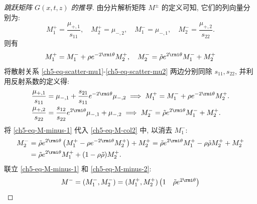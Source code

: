 \begin{proof}[跳跃矩阵 $G(x,t,z)$ 的推导]
    由分片解析矩阵 $ M^{\pm} $ 的定义可知, 它们的列向量分别为:
    \begin{equation}
        M^{+}_{1}  = \frac{\mu_{+,1}}{s_{11}}, \quad M^{+}_{2} = \mu_{-,2}, \quad M^{-}_{1} = \mu_{-,1}, \quad M^{-}_{2} = \frac{\mu_{+,2}}{s_{22}}.
    \end{equation}
    则有
    \begin{equation}
        M_{1}^{+} = M_{1}^{-} + \rho e^{-2 \rmi\theta} M_{2}^{+}, \quad M_{2}^{-} = \tilde{\rho} e^{2\rmi\theta} M_{1}^{-} + M_{2}^{+}
        \label{ch5-eq-M-minus-1}
    \end{equation}
    将散射关系 \eqref{ch5-eq-scatter-mu1}-\eqref{ch5-eq-scatter-mu2} 两边分别同除 $s_{11}, s_{22}$, 并利用反射系数的定义得:
    \begin{align}
        \frac{\mu_{+,1}}{s_{11}} & = \mu_{-,1} + \frac{s_{21}}{s_{11}} e^{-2 \rmi \theta} \mu_{-,2} \implies M^{+}_{1} = M^{-}_{1} + \rho e^{-2 \rmi \theta} M^{+}_{2}.
        \label{ch5-eq-M-col1}                                                                                                                                                 \\
        \frac{\mu_{+,2}}{s_{22}} & = \frac{s_{12}}{s_{22}} e^{2 \rmi \theta} \mu_{-,1} + \mu_{-,2} \implies M^{-}_{2} = \tilde{\rho} e^{2 \rmi \theta} M^{-}_{1} + M^{+}_{2}.
        \label{ch5-eq-M-col2}
    \end{align}
    将 \eqref{ch5-eq-M-minus-1} 代入 \eqref{ch5-eq-M-col2} 中, 以消去 $M^{-}_{1}$:
    \begin{equation}
        \begin{aligned}
            M^{-}_{2} & = \tilde{\rho} e^{2 \rmi \theta} \left( M^{+}_{1} - \rho e^{-2 \rmi \theta} M^{+}_{2} \right) + M^{+}_{2}
            = \tilde{\rho} e^{2 \rmi \theta} M^{+}_{1} - \rho \tilde{\rho} M^{+}_{2} + M^{+}_{2}                                  \\
                      & = \tilde{\rho} e^{2 \rmi \theta} M^{+}_{1} + (1 - \rho \tilde{\rho}) M^{+}_{2}.
        \end{aligned}
        \label{ch5-eq-M-minus-2}
    \end{equation}
    联立 \eqref{ch5-eq-M-minus-1} 和 \eqref{ch5-eq-M-minus-2}:
    \begin{equation}
        M^{-} = (M^{-}_{1}, M^{-}_{2}) = (M^{+}_{1}, M^{+}_{2})
        \begin{pmatrix}
            1                        & \tilde{\rho} e^{2 \rmi \theta} \\

\end{pmatrix}
\end{equation}
\end{proof}
